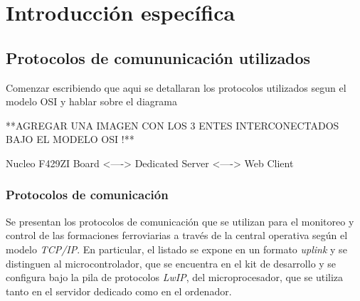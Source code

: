 \chapter{Introducción específica} %

\label{Chapter2}


\section{Protocolos de comununicación utilizados}

  Comenzar escribiendo que aqui se detallaran los protocolos utilizados segun el modelo OSI y hablar sobre el diagrama    

  **AGREGAR UNA IMAGEN CON LOS 3 ENTES INTERCONECTADOS BAJO EL MODELO OSI !**

        Nucleo F429ZI Board <----> Dedicated Server <----> Web Client


\subsection{Protocolos de comunicación}

Se presentan los protocolos de comunicación que se utilizan para el monitoreo y control de las formaciones ferroviarias a través de la central operativa según el modelo \textit{TCP/IP}. En particular, el listado se expone en un formato \textit{uplink} y se distinguen al microcontrolador, que se encuentra en el kit de desarrollo y se configura bajo la pila de protocolos \textit{LwIP}, del microprocesador, que se utiliza tanto en el servidor dedicado como en el ordenador. 




